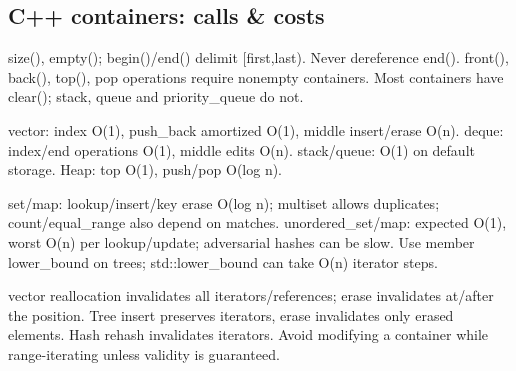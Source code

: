 \begin{multicols}{\Columns}
\subsection{C++ containers: calls \& costs}
 size(), empty(); begin()/end() delimit [first,last). Never dereference end(). front(), back(), top(), pop operations require nonempty containers. Most containers have clear(); stack, queue and priority\_queue do not.\par
{} vector: index O(1), push\_back amortized O(1), middle insert/erase O(n). deque: index/end operations O(1), middle edits O(n). stack/queue: O(1) on default storage. Heap: top O(1), push/pop O(log n).\par
{} set/map: lookup/insert/key erase O(log n); multiset allows duplicates; count/equal\_range also depend on matches. unordered\_set/map: expected O(1), worst O(n) per lookup/update; adversarial hashes can be slow. Use member lower\_bound on trees; std::lower\_bound can take O(n) iterator steps.\par
{} vector reallocation invalidates all iterators/references; erase invalidates at/after the position. Tree insert preserves iterators, erase invalidates only erased elements. Hash rehash invalidates iterators. Avoid modifying a container while range-iterating unless validity is guaranteed.\par

\end{multicols}
